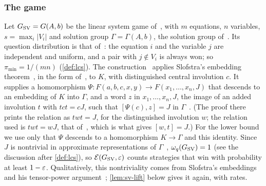 \subsubsection*{The game}

Let $G_{\mathrm{SV}}=G(A,b)$ be the linear system game of~\cite[Theorem~1.1]{SV18}, with $m$ equations, $n$ variables, $s=\max_i\lvert V_i\rvert$ and
solution group $\Gamma=\Gamma(A,b)$, the solution group of~\cite[Proposition~6.1]{SV18}. Its question distribution is that
of~\cite[Section~4]{SV18}: the equation $i$ and the variable $j$ are independent and uniform, and a pair with $j\notin V_i$ is always won;
so $\pi_{\min}=1/(mn)$ (\cref{def:lcs}). The construction~\cite[Propositions~6.1 and~6.2]{SV18} applies Slofstra's embedding
theorem~\cite{Slo20}, in the form of~\cite[\S4]{Slo19}, to $K$, with distinguished central involution $c$. It supplies a homomorphism
$\Psi:F(a,b,c,x,y)\to F(x_1,\dots,x_n,J)$ that descends to an embedding of $K$ into $\Gamma$, and a word $z$ in $x_1,\dots,x_n,J$, the
image of an added involution $t$ with $tct=cJ$, such that $[\Psi(c),z]=J$ in $\Gamma$~\cite[proof of Proposition~6.2]{SV18}. (The proof
there prints the relation as $twt=J$, for the distinguished involution $w$; the relation used is $twt=wJ$, that of~\cite[Lemma~5.2]{Slo19},
which is what gives $[w,t]=J$.) For the lower bound we use only that $\Psi$ descends to a homomorphism $K\to\Gamma$ and this identity.
Since $J$ is nontrivial in approximate representations of $\Gamma$~\cite[Proposition~6.1]{SV18}, $\omega_{q}(G_{\mathrm{SV}})=1$ (see the discussion after
\cref{def:lcs}), so $\mathcal E(G_{\mathrm{SV}},\varepsilon)$ counts strategies that win with probability at least $1-\varepsilon$. Qualitatively, this nontriviality comes
from Slofstra's embeddings and his tensor-power argument~\cite[Lemma~5.2]{Slo19}; \cref{lem:sv-lift} below gives it again, with rates.

